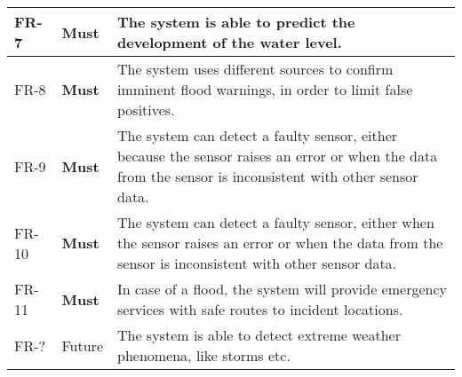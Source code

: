 \begin{tabular}{p{} p{} p{}}
    \hline {} \label{fr:7} FR-7 & 
      \textbf{Must} &
      The system is able to predict the development of the water level. \\
	
    \hline {} \label{fr:8} FR-8 & 
      \textbf{Must} &
     The system uses different sources to confirm imminent flood warnings, in order to limit false positives. \\
	
    \hline {} \label{fr:9} FR-9 & 
      \textbf{Must} &
     The system can detect a faulty sensor, either because the sensor raises an error or when the data from the sensor is inconsistent with other sensor data. \\
	
    \hline {} \label{fr:10} FR-10 & 
      \textbf{Must} &
     The system can detect a faulty sensor, either when the sensor raises an error or when the data from the sensor is inconsistent with other sensor data. \\
    
	\hline {} \label{fr:11} FR-11 & 
      \textbf{Must} &
     In case of a flood, the system will provide emergency services with safe routes to incident locations. \\	
	
    \hline {} \label{fr:x} FR-? & 
      Future &
     The system is able to detect extreme weather phenomena, like storms etc. \\
\end{tabular}